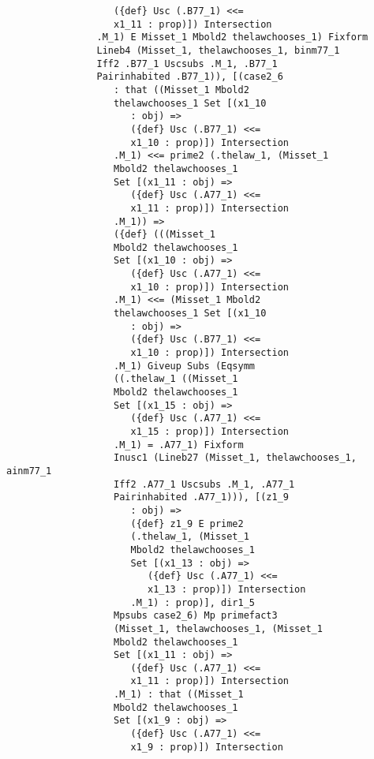 \documentclass[12pt]{article}
\begin{document}
\begin{verbatim}
                   ({def} Usc (.B77_1) <<= 
                   x1_11 : prop)]) Intersection 
                .M_1) E Misset_1 Mbold2 thelawchooses_1) Fixform 
                Lineb4 (Misset_1, thelawchooses_1, binm77_1 
                Iff2 .B77_1 Uscsubs .M_1, .B77_1 
                Pairinhabited .B77_1)), [(case2_6 
                   : that ((Misset_1 Mbold2 
                   thelawchooses_1 Set [(x1_10 
                      : obj) => 
                      ({def} Usc (.B77_1) <<= 
                      x1_10 : prop)]) Intersection 
                   .M_1) <<= prime2 (.thelaw_1, (Misset_1 
                   Mbold2 thelawchooses_1 
                   Set [(x1_11 : obj) => 
                      ({def} Usc (.A77_1) <<= 
                      x1_11 : prop)]) Intersection 
                   .M_1)) => 
                   ({def} (((Misset_1 
                   Mbold2 thelawchooses_1 
                   Set [(x1_10 : obj) => 
                      ({def} Usc (.A77_1) <<= 
                      x1_10 : prop)]) Intersection 
                   .M_1) <<= (Misset_1 Mbold2 
                   thelawchooses_1 Set [(x1_10 
                      : obj) => 
                      ({def} Usc (.B77_1) <<= 
                      x1_10 : prop)]) Intersection 
                   .M_1) Giveup Subs (Eqsymm 
                   ((.thelaw_1 ((Misset_1 
                   Mbold2 thelawchooses_1 
                   Set [(x1_15 : obj) => 
                      ({def} Usc (.A77_1) <<= 
                      x1_15 : prop)]) Intersection 
                   .M_1) = .A77_1) Fixform 
                   Inusc1 (Lineb27 (Misset_1, thelawchooses_1, ainm77_1 
                   Iff2 .A77_1 Uscsubs .M_1, .A77_1 
                   Pairinhabited .A77_1))), [(z1_9 
                      : obj) => 
                      ({def} z1_9 E prime2 
                      (.thelaw_1, (Misset_1 
                      Mbold2 thelawchooses_1 
                      Set [(x1_13 : obj) => 
                         ({def} Usc (.A77_1) <<= 
                         x1_13 : prop)]) Intersection 
                      .M_1) : prop)], dir1_5 
                   Mpsubs case2_6) Mp primefact3 
                   (Misset_1, thelawchooses_1, (Misset_1 
                   Mbold2 thelawchooses_1 
                   Set [(x1_11 : obj) => 
                      ({def} Usc (.A77_1) <<= 
                      x1_11 : prop)]) Intersection 
                   .M_1) : that ((Misset_1 
                   Mbold2 thelawchooses_1 
                   Set [(x1_9 : obj) => 
                      ({def} Usc (.A77_1) <<= 
                      x1_9 : prop)]) Intersection 

\end{verbatim}
\end{document}
